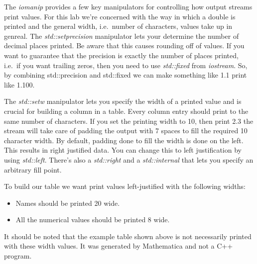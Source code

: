 \documentclass[nobib]{tufte-handout}
\begin{document}
The \textit{iomanip} provides a few key manipulators for controlling how output streams print values. For this lab we're concerned with the way in which a double is printed and the general width, i.e.\ number of characters, values take up in genreal. The \textit{std::setprecision} manipulator lets your determine the number of decimal places printed. Be aware that this causes rounding off of values.  If you want to guarantee that the precision is exactly the number of places printed, i.e.\ if you want trailing zeros, then you need to use \textit{std::fixed} from \textit{iostream}.  So, by combining std::precision and std::fixed we can make something like 1.1 print like 1.100.


The \textit{std::setw}  manipulator lets you specify the width of a printed value and is crucial for building a column in a table. Every column entry should print to the same number of characters. If you set the printing width to 10, then print 2.3 the stream will take care of padding the output with 7 spaces to fill the required 10 character width. By default, padding done to fill the width is done on the left. This results in right justified data. You can change this to left justification by using \textit{std::left}. There's also a \textit{std::right} and a \textit{std::internal} that lets you specify an arbitrary fill point.

To build our table we want print values left-justified with the following widths:
\begin{itemize}
\item Names should be printed 20 wide.
\item All the numerical values should be printed 8 wide.
\end{itemize}
It should be noted that the example table shown above is not necessarily printed with these width values. It was generated by Mathematica and not a C++ program.
\end{document}
